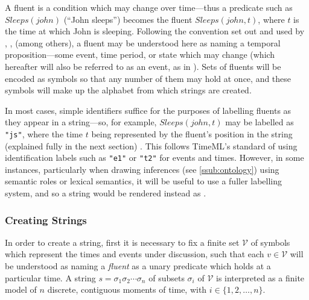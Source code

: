 \documentclass[a4paper,12pt,leqno]{article}
\newcommand{\vph}[1]{\vphantom{#1}}
\newcommand{\ebox}[1]{\fbox{$\vph{'(),}#1$}}
\newcommand{\V}{\mathcal{V}}
\newcommand{\EventString}[1]{%
	\renewcommand*{\do}[1]{\ebox{##1}}%
	\PipeParser{#1}%
}
\newcommand{\citeneeded}[1][]{{\color{red}[Citation needed!#1]}}
\newcommand{\selfnote}[1]{{\color{red}[NB\footnote{{\color{red}#1}}]}}
\newcommand{\nb}{\selfnote}
\begin{document}

A fluent is a condition which may change over time---thus a predicate such as $\allowbreak{}Sleeps(john)$ (``John sleeps'') becomes the fluent $Sleeps(john, t)$, where $t$ is the time at which John is sleeping. Following the convention set out and used by \citet{Mccarthy69somephilosophical}, \citet{van2008proper}, \citet{fernando2016prior} (among others), a fluent may be understood here as naming a temporal proposition---some event, time period, or state which may change (which hereafter will also be referred to as an event, as in \citet{Pustejovsky2005}). Sets of fluents will be encoded as symbols so that any number of them may hold at once, and these symbols will make up the alphabet from which strings are created.

In most cases, simple identifiers suffice for the purposes of labelling fluents as they appear in a string---so, for example, $Sleeps(john, t)$ may be labelled as \texttt{"js"}, where the time $t$ being represented by the fluent's position in the string (explained fully in the next section)%
. This follows TimeML's standard \citep{pustejovsky2010iso} of using identification labels such as \texttt{"e1"} or \texttt{"t2"} for events and times. However, in some instances, particularly when drawing inferences (see %
\cref{ssub:ontology}) using semantic roles or lexical semantics, it will be useful to use a fuller labelling system, and so a string \EventString{{}|js|{}} would be rendered instead as \EventString{{}|sleeps(john)|{}}.

\subsubsection{Creating Strings}\label{ssub:creating}
In order to create a string, first it is necessary to fix a finite set $\V$ of symbols which represent the times and events under discussion, such that each $v \in \V$ will be understood as naming a \textit{fluent} as a unary predicate which holds at a particular time. A string $s = \sigma_1\sigma_2\cdots\sigma_n$ of subsets $\sigma_i$ of $\V$ is interpreted as a finite model of $n$ discrete, contiguous moments of time, with $i \in \{1, 2, \ldots, n\}$.
\end{document}
